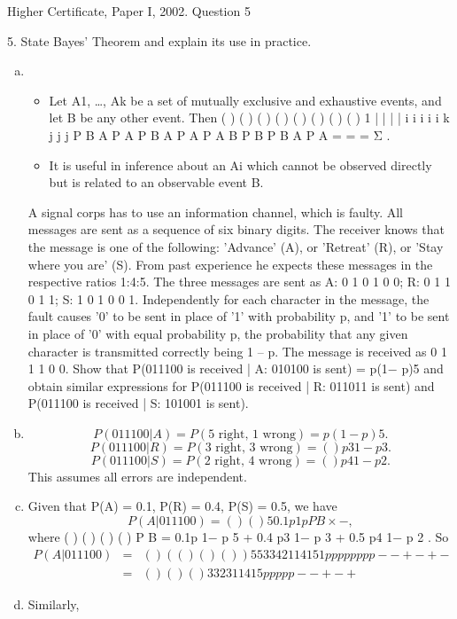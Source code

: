 \documentclass[a4paper,12pt]{article}
\begin{document}
Higher Certificate, Paper I, 2002. Question 5
\begin{framed}
5. State Bayes' Theorem and explain its use in practice.
\end{framed}
\begin{enumerate}[(a)]
    \item 
\begin{itemize}
\item Let A1, …, Ak be a set of mutually exclusive and exhaustive events, and let B be any
other event.
Then ( ) ( ) ( )
( )
( ) ( )
( ) ( )
1
| |
|
|
i i i i
i k
j j
j
P B A P A P B A P A
P A B
P B P B A P A
=
= =
Σ
.
\item It is useful in inference about an Ai which cannot be observed directly but is related to
an observable event B.
\end{itemize}


\begin{framed}
A signal corps has to use an information channel, which is faulty. All messages
are sent as a sequence of six binary digits. The receiver knows that the message is
one of the following: 'Advance' (A), or 'Retreat' (R), or 'Stay where you are' (S).
From past experience he expects these messages in the respective ratios 1:4:5.
The three messages are sent as
A: 0 1 0 1 0 0; R: 0 1 1 0 1 1; S: 1 0 1 0 0 1.
Independently for each character in the message, the fault causes '0' to be sent in
place of '1' with probability p, and '1' to be sent in place of '0' with equal
probability p, the probability that any given character is transmitted correctly
being 1 – p. The message is received as 0 1 1 1 0 0. Show that
P(011100 is received | A: 010100 is sent) = p(1− p)5
and obtain similar expressions for
P(011100 is received | R: 011011 is sent)
and
P(011100 is received | S: 101001 is sent).
\end{framed}



\item 
\[P(011100|A) = P(\mbox{5 right, 1 wrong}) = p(1− p)5 .\]
\[P(011100|R) = P(\mbox{3 right, 3 wrong}) = ( )p3 1− p 3 .\]
\[P(011100|S) = P(\mbox{2 right, 4 wrong}) = ( )p4 1− p 2 .\]
This assumes all errors are independent.
\item Given that P(A) = 0.1, P(R) = 0.4, P(S) = 0.5, we have 
\[P(A|011100) = ( )
( )
5 0.1 p 1 p
P B
× −
,\]
where ( ) ( ) ( ) ( ) P B = 0.1p 1− p 5 + 0.4 p3 1− p 3 + 0.5 p4 1− p 2 .
So
\begin{eqnarray*}
P(A|011100) &=& ( )
( ( ) ( ) ( ) )
5
5 3 3 4 2
1
1 4 1 5 1
p p
p p p p p p
−
− + − + −
\\ &=&  ( )
( ) ( )
3
3 2 3
1
1 4 1 5
p
p p p p
−
− + − +
\end{eqnarray*}
\item Similarly, 


\end{enumerate}
\end{document}
